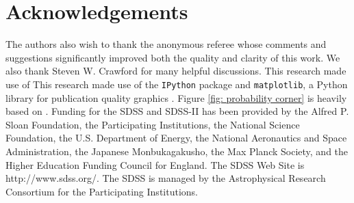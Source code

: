\documentclass[fleqn,usenatbib]{mnras}
\begin{document}
\section*{Acknowledgements}
The authors also wish to thank the anonymous referee whose comments and suggestions significantly improved both the quality and clarity of this work. We also thank Steven W. Crawford for many helpful discussions. This research made use of This research made use of the {\tt IPython} package \citep{Perez2007} and {\tt matplotlib}, a Python library for publication quality graphics \citep{Hunter2007}. Figure \ref{fig: probability corner} is heavily based on \cite{Foreman-Mackey2016}. Funding for the SDSS and SDSS-II has been provided by the Alfred P. Sloan Foundation, the Participating Institutions, the National Science Foundation, the U.S. Department of Energy, the National Aeronautics and Space Administration, the Japanese Monbukagakusho, the Max Planck Society, and the Higher Education Funding Council for England. The SDSS Web Site is http://www.sdss.org/. The SDSS is managed by the Astrophysical Research Consortium for the Participating Institutions.



%
%

\bsp	%
\label{lastpage}
\end{document}

